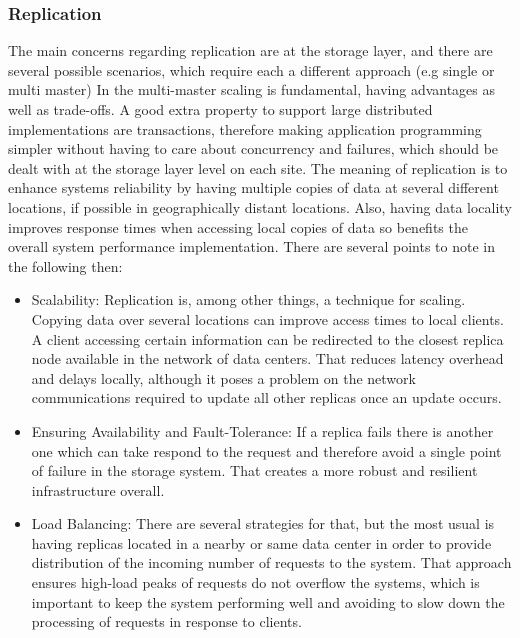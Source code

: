 	\subsubsection{Replication} %
	The main concerns regarding replication are at the storage layer, and there are several possible scenarios, which require each a different approach (e.g single or multi master) In the multi-master scaling is fundamental, having advantages as well as trade-offs. A good extra property to support large distributed implementations are transactions, therefore making application programming simpler without having to care about concurrency and failures, which should be dealt with at the storage layer level on each site.	
	The meaning of replication is to enhance systems reliability by having multiple copies of data at several different locations, if possible in geographically distant locations. Also, having data locality improves response times when accessing local copies of data so benefits the overall system performance implementation. There are several points to note in the following then:

\begin{itemize}
	\item{Scalability:}
	Replication is, among other things, a technique for scaling. Copying data over several locations can improve access times to local clients. A client accessing certain information can be redirected to the closest replica node available in the network of data centers. That reduces latency overhead and delays locally, although it poses a problem on the network communications required to update all other replicas once an update occurs.

	\item{Ensuring Availability and Fault-Tolerance:}
	If a replica fails there is another one which can take respond to the request and therefore avoid a single point of failure in the storage system. That creates a more robust and resilient infrastructure overall.

	\item{Load Balancing:}
	There are several strategies for that, but the most usual is having replicas located in a nearby or same data center in order to provide distribution of the incoming number of requests to the system. That approach ensures high-load peaks of requests do not overflow the systems, which is important to keep the system performing well and avoiding to slow down the processing of requests in response to clients.
\end{itemize}
	
